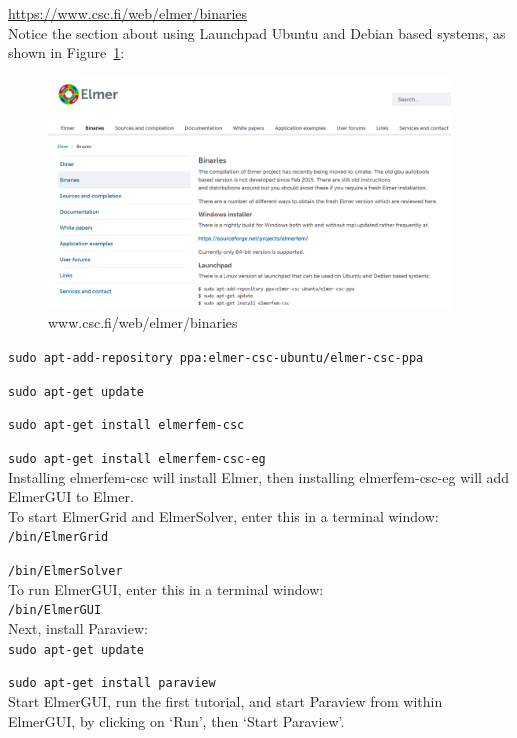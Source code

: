  \url{https://www.csc.fi/web/elmer/binaries}\\

Notice the section about using Launchpad Ubuntu and Debian based systems, as shown in Figure~\ref{fg:binaries}:\\

\begin{figure}[H]
\begin{center}
\includegraphics[width=0.95\textwidth]{binaries}
\caption{www.csc.fi/web/elmer/binaries}\label{fg:binaries}
\end{center}
\end{figure}


\texttt{sudo apt-add-repository ppa:elmer-csc-ubuntu/elmer-csc-ppa}

\texttt{sudo apt-get update}

\texttt{sudo apt-get install elmerfem-csc}

\texttt{sudo apt-get install elmerfem-csc-eg}\\

Installing elmerfem-csc will install Elmer, then installing elmerfem-csc-eg will add ElmerGUI to Elmer.\\

To start ElmerGrid and ElmerSolver, enter this in a terminal window:\\

\texttt{/bin/ElmerGrid}

\texttt{/bin/ElmerSolver}\\

To run ElmerGUI, enter this in a terminal window:\\

\texttt{/bin/ElmerGUI}\\

Next, install Paraview:\\

\texttt{sudo apt-get update}

\texttt{sudo apt-get install paraview}\\

Start ElmerGUI, run the first tutorial, and start Paraview from within ElmerGUI, by clicking on `Run', then `Start Paraview'.










